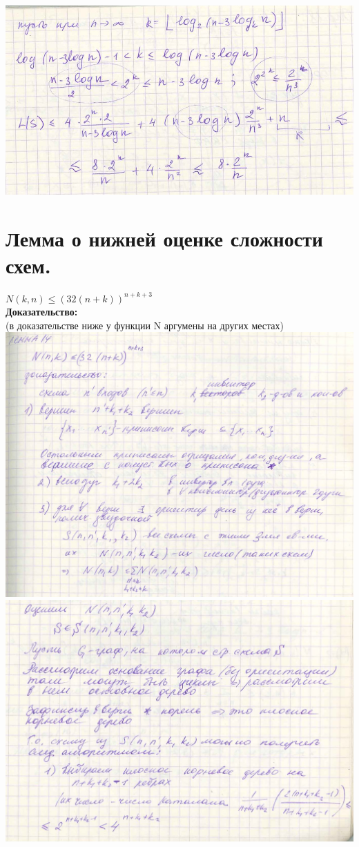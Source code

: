 \documentclass[12pt]{article}
\begin{document}
	\includegraphics[width=400pt]{32}\\

\section{Лемма о нижней оценке сложности схем.}
	$N(k, n) \leqslant (32(n+k))^{n+k+3}$\\
	\textbf{Доказательство:}\\
		(в доказательстве ниже у функции N аргумены на других местах)\\
		\includegraphics[width=500pt]{33}\\
		\includegraphics[width=500pt]{34}\\
\end{document}
